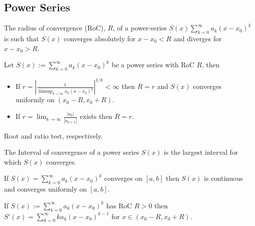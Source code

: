 \dotfill
\begin{multicols}{2}
\subsection*{Power Series}

\begin{definition}
The radius of convergence (RoC), $R$, of a power-series $S(x)\sum_{k=0}^\infty a_k(x-x_0)^k$ is such that $S(x)$ converges absolutely for $x-x_0<R$ and diverges for $x-x_0>R$.
\end{definition}

\begin{theorem}
Let $S(x):=\sum_{k=0}^\infty a_k(x-x_0)^k$ be a power series with RoC $R$, then
\begin{itemize}
    \item{If $r=\left|\frac{1}{\limsup_{k\to\infty}a_k(x-x_0)^k}\right|^{1/k}<\infty$ then $R=r$ and $S(x)$ converges uniformly on $(x_0-R,x_0+R)$.}
    \item{If $r=\lim_{k\to\infty}\frac{|a_k|}{|a_{k+1}|}$ exists then $R=r$.}
\end{itemize}
\end{theorem}
\begin{proof1}
Root and ratio test, respectively.
\end{proof1}

\begin{definition}
The Interval of convergence of a power series $S(x)$ is the largest interval for which $S(x)$ converges.
\end{definition}

\begin{theorem}
If $S(x) = \sum_{k=0}^\infty a_k(x-x_0)^k$ converges on $[a,b]$ then $S(x)$ is continuous and converges uniformly on $[a,b]$.
\end{theorem}

\begin{theorem}
If $S(x):=\sum_{k=0}^\infty a_k(x-x_0)^k$ has RoC $R>0$ then $S'(x)=\sum_{k=0}^\infty ka_k(x-x_0)^{k-1}$ for $x\in(x_0-R,x_0+R)$.
\end{theorem}
\end{multicols}